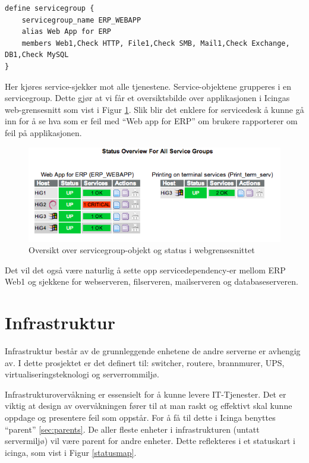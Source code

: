 \begin{lstlisting}
define servicegroup {
	servicegroup_name ERP_WEBAPP
	alias Web App for ERP
	members Web1,Check HTTP, File1,Check SMB, Mail1,Check Exchange, DB1,Check MySQL
}
\end{lstlisting}


Her kjøres service-sjekker mot alle tjenestene. Service-objektene grupperes i en servicegroup. 
Dette gjør at vi får et oversiktsbilde over applikasjonen i Icingas web-grensesnitt som vist i Figur \ref{servicegroup_web}. Slik blir det enklere for servicedesk å kunne gå inn for å se hva som er feil med “Web app for ERP” om brukere rapporterer om feil på applikasjonen.

\begin{figure}[H]
    \centering
    \includegraphics[scale=0.6]{img/servicegroup_web}
    \caption{ Oversikt over servicegroup-objekt og status i webgrensesnittet}
    \label{servicegroup_web}
\end{figure}

Det vil det også være naturlig å sette opp servicedependency-er mellom ERP Web1 og sjekkene for webserveren, filserveren, mailserveren og databaseserveren.

\section{Infrastruktur}
Infrastruktur består av de grunnleggende enhetene de andre serverne er avhengig av. I dette prosjektet er det definert til: switcher, routere, brannmurer, UPS, virtualiseringsteknologi og serverrommiljø.

Infrastrukturovervåkning er essensielt for å kunne levere IT-Tjenester. Det er viktig at design av overvåkningen fører til at man raskt og effektivt skal kunne oppdage og presentere feil som oppstår. For å få til dette i Icinga benyttes “parent” \ref{sec:parents}. De aller fleste enheter i infrastrukturen (untatt servermiljø) vil være parent for andre enheter. Dette reflekteres i et statuskart i icinga, som vist i Figur \ref{statusmap}.

